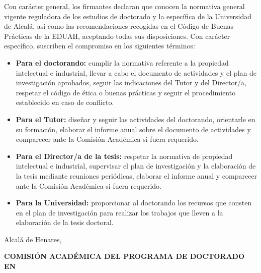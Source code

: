 \documentclass[10pt,a4paper,oneside]{article}
\begin{document}
Con carácter general, los firmantes declaran que conocen la normativa general vigente reguladora de los estudios de doctorado y la específica de la Universidad de Alcalá, así como las recomendaciones recogidas en el Código de Buenas Prácticas de la EDUAH, aceptando todas sus disposiciones. Con carácter específico, suscriben el compromiso en los siguientes términos:
\begin{itemize}[leftmargin=0.45cm,itemsep=0pt,topsep=0.05cm,parsep=0pt]
\item \textbf{Para el doctorando:} cumplir la normativa referente a la propiedad intelectual e industrial, llevar a cabo el documento de actividades y el plan de investigación aprobados, seguir las indicaciones del Tutor y del Director/a, respetar el código de ética o buenas prácticas y seguir el procedimiento establecido en caso de conflicto.
\item \textbf{Para el Tutor:} diseñar y seguir las actividades del doctorando, orientarle en su formación, elaborar el informe anual sobre el documento de actividades y comparecer ante la Comisión Académica si fuera requerido.
\item \textbf{Para el Director/a de la tesis:} respetar la normativa de propiedad intelectual e industrial, supervisar el plan de investigación y la elaboración de la tesis mediante reuniones periódicas, elaborar el informe anual y comparecer ante la Comisión Académica si fuera requerido.
\item \textbf{Para la Universidad:} proporcionar al doctorando los recursos que consten en el plan de investigación para realizar los trabajos que lleven a la elaboración de la tesis doctoral.
\end{itemize}

\vspace{0.15cm}
\begin{center}Alcalá de Henares, \PhDUnderline{5.0cm}{\myPaperworkDate}\end{center}
\begin{center}
\hfill
{}\hfill
{}
\end{center}
\textbf{COMISIÓN ACADÉMICA DEL PROGRAMA DE DOCTORADO EN}\par
\PhDUnderline{\linewidth}{\myPhDProgram}
\enlargethispage{1.8cm}
\end{document}

